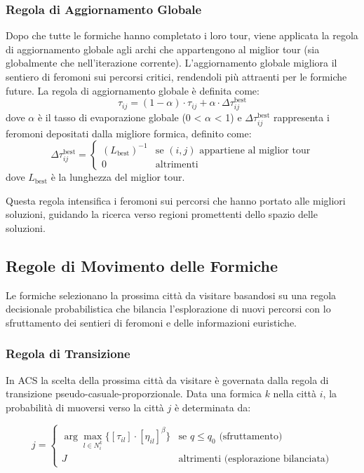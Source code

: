 \subsubsection{Regola di Aggiornamento Globale}
Dopo che tutte le formiche hanno completato i loro tour, viene applicata la regola di aggiornamento globale agli archi che appartengono al miglior tour (sia globalmente che nell'iterazione corrente). L'aggiornamento globale migliora il sentiero di feromoni sui percorsi critici, rendendoli più attraenti per le formiche future. La regola di aggiornamento globale è definita come:
\[
	\tau_{ij} = (1 - \alpha) \cdot \tau_{ij} + \alpha \cdot \Delta \tau_{ij}^{\text{best}}
\]
dove $\alpha$ è il tasso di evaporazione globale (0 < $\alpha$ < 1) e $\Delta \tau_{ij}^{\text{best}}$ rappresenta i feromoni depositati dalla migliore formica, definito come:
\[
	\Delta \tau_{ij}^{\text{best}} = \begin{cases}
		(L_{\text{best}})^{-1} & \text{se }(i,j)\text{ appartiene al miglior tour} \\
		0                      & \text{altrimenti}
	\end{cases}
\]
dove $L_{\text{best}}$ è la lunghezza del miglior tour.

Questa regola intensifica i feromoni sui percorsi che hanno portato alle migliori soluzioni, guidando la ricerca verso regioni promettenti dello spazio delle soluzioni.

\subsection{Regole di Movimento delle Formiche}

Le formiche selezionano la prossima città da visitare basandosi su una regola decisionale probabilistica che bilancia l'esplorazione di nuovi percorsi con lo sfruttamento dei sentieri di feromoni e delle informazioni euristiche.

\subsubsection{Regola di Transizione}
In \gls{ACS} la scelta della prossima città da visitare è governata dalla regola di transizione pseudo-casuale-proporzionale. Data una formica $k$ nella città $i$, la probabilità di muoversi verso la città $j$ è determinata da:

\[
	j = \begin{cases}
		\arg\max_{l \in N_i^k} \{[\tau_{il}] \cdot [\eta_{il}]^\beta\} & \text{se }q \leq q_0 \text{ (sfruttamento)} \\
		J                                                              & \text{altrimenti (esplorazione bilanciata)}
	\end{cases}
\]

